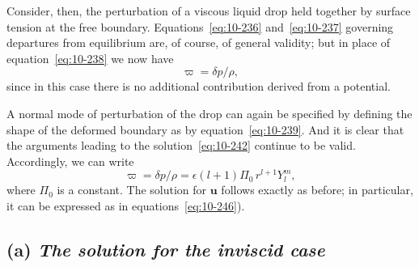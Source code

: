 Consider, then, the perturbation of a viscous liquid drop held together by surface tension at the free boundary. Equations~\eqref{eq:10-236} and~\eqref{eq:10-237} governing departures from equilibrium are, of course, of general validity; but in place of equation~\eqref{eq:10-238} we now have
\begin{equation}
\label{eq:10-292}
\varpi = \delta p/\rho,
\end{equation}
since in this case there is no additional contribution derived from a potential.

A normal mode of perturbation of the drop can again be specified by defining the shape of the deformed boundary as by equation~\eqref{eq:10-239}. And it is clear that the arguments leading to the solution~\eqref{eq:10-242} continue to be valid. Accordingly, we can write
\begin{equation}
\label{eq:10-293}
\varpi = \delta p/\rho = \epsilon(l+1)\Pi_0\,r^{l+1}Y_l^m,
\end{equation}
where $\Pi_0$ is a constant. The solution for $\mathbf{u}$ follows exactly as before; in particular, it can be expressed as in equations~\eqref{eq:10-246}).

\subsection*{(a) \textit{The solution for the inviscid case}}

